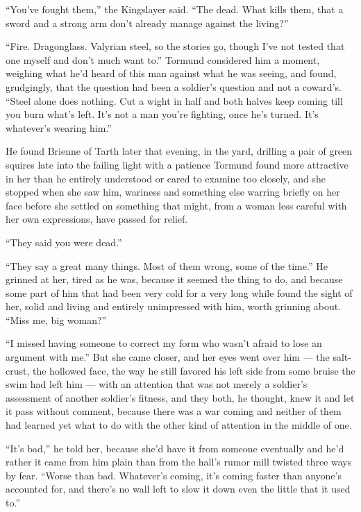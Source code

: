“You’ve fought them,” the Kingslayer said. “The dead. What kills them, that a sword and a strong arm don’t already manage against the living?”

“Fire. Dragonglass. Valyrian steel, so the stories go, though I’ve not tested that one myself and don’t much want to.” Tormund considered him a moment, weighing what he’d heard of this man against what he was seeing, and found, grudgingly, that the question had been a soldier’s question and not a coward’s. “Steel alone does nothing. Cut a wight in half and both halves keep coming till you burn what’s left. It’s not a man you’re fighting, once he’s turned. It’s whatever’s wearing him.”

\sceneBreak

He found Brienne of Tarth later that evening, in the yard, drilling a pair of green squires late into the failing light with a patience Tormund found more attractive in her than he entirely understood or cared to examine too closely, and she stopped when she saw him, wariness and something else warring briefly on her face before she settled on something that might, from a woman less careful with her own expressions, have passed for relief.

“They said you were dead.”

“They say a great many things. Most of them wrong, some of the time.” He grinned at her, tired as he was, because it seemed the thing to do, and because some part of him that had been very cold for a very long while found the sight of her, solid and living and entirely unimpressed with him, worth grinning about. “Miss me, big woman?”

“I missed having someone to correct my form who wasn’t afraid to lose an argument with me.” But she came closer, and her eyes went over him — the salt-crust, the hollowed face, the way he still favored his left side from some bruise the swim had left him — with an attention that was not merely a soldier’s assessment of another soldier’s fitness, and they both, he thought, knew it and let it pass without comment, because there was a war coming and neither of them had learned yet what to do with the other kind of attention in the middle of one.

“It’s bad,” he told her, because she’d have it from someone eventually and he’d rather it came from him plain than from the hall’s rumor mill twisted three ways by fear. “Worse than bad. Whatever’s coming, it’s coming faster than anyone’s accounted for, and there’s no wall left to slow it down even the little that it used to.”

